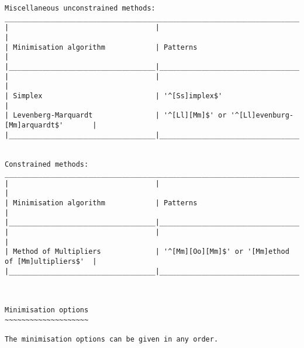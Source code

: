 \begin{verbatim}
Miscellaneous unconstrained methods:
___________________________________________________________________________________________
|                                   |                                                     |
| Minimisation algorithm            | Patterns                                            |
|___________________________________|_____________________________________________________|
|                                   |                                                     |
| Simplex                           | '^[Ss]implex$'                                      |
| Levenberg-Marquardt               | '^[Ll][Mm]$' or '^[Ll]evenburg-[Mm]arquardt$'       |
|___________________________________|_____________________________________________________|


Constrained methods:
___________________________________________________________________________________________
|                                   |                                                     |
| Minimisation algorithm            | Patterns                                            |
|___________________________________|_____________________________________________________|
|                                   |                                                     |
| Method of Multipliers             | '^[Mm][Oo][Mm]$' or '[Mm]ethod of [Mm]ultipliers$'  |
|___________________________________|_____________________________________________________|



Minimisation options
~~~~~~~~~~~~~~~~~~~~

The minimisation options can be given in any order.



\end{verbatim}
